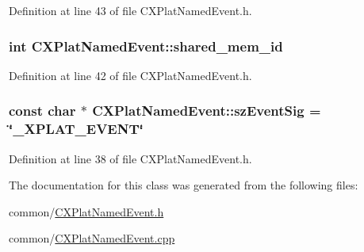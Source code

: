 \-Definition at line 43 of file \-C\-X\-Plat\-Named\-Event.\-h.

\hypertarget{class_c_x_plat_named_event_afb8505ea92041775d39a44909c214e75}{
\subsubsection[{shared\-\_\-mem\-\_\-id}]{\setlength{\rightskip}{0pt plus 5cm}int {\bf \-C\-X\-Plat\-Named\-Event\-::shared\-\_\-mem\-\_\-id}}}\label{class_c_x_plat_named_event_afb8505ea92041775d39a44909c214e75}


\-Definition at line 42 of file \-C\-X\-Plat\-Named\-Event.\-h.

\hypertarget{class_c_x_plat_named_event_ab2c98fd3e2ca6ad1a0bf72e18f861512}{
\subsubsection[{sz\-Event\-Sig}]{\setlength{\rightskip}{0pt plus 5cm}const char $\ast$ {\bf \-C\-X\-Plat\-Named\-Event\-::sz\-Event\-Sig} = \char`\"{}\-\_\-\-X\-P\-L\-A\-T\-\_\-\-E\-V\-E\-N\-T\char`\"{}}}\label{class_c_x_plat_named_event_ab2c98fd3e2ca6ad1a0bf72e18f861512}


\-Definition at line 38 of file \-C\-X\-Plat\-Named\-Event.\-h.



\-The documentation for this class was generated from the following files\-:\begin{DoxyCompactItemize}
\item 
common/\hyperlink{_c_x_plat_named_event_8h}{\-C\-X\-Plat\-Named\-Event.\-h}\item 
common/\hyperlink{_c_x_plat_named_event_8cpp}{\-C\-X\-Plat\-Named\-Event.\-cpp}\end{DoxyCompactItemize}
